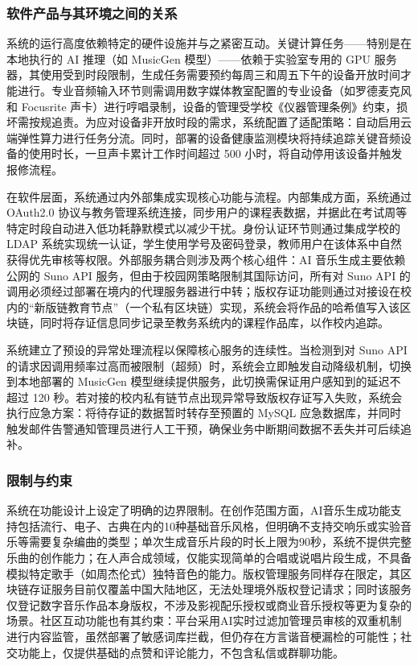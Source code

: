 \documentclass{base}
\numberwithin{figure}{section} %
\begin{document}
\subsubsection{软件产品与其环境之间的关系}

系统的运行高度依赖特定的硬件设施并与之紧密互动。关键计算任务——特别是在本地执行的 AI 推理（如 MusicGen 模型）——依赖于实验室专用的 GPU 服务器，其使用受到时段限制，生成任务需要预约每周三和周五下午的设备开放时间才能进行。专业音频输入环节则需调用数字媒体教室配置的专业设备（如罗德麦克风和 Focusrite 声卡）进行哼唱录制，设备的管理受学校《仪器管理条例》约束，损坏需按规追责。为应对设备非开放时段的需求，系统配置了适配策略：自动启用云端弹性算力进行任务分流。同时，部署的设备健康监测模块将持续追踪关键音频设备的使用时长，一旦声卡累计工作时间超过 500 小时，将自动停用该设备并触发报修流程。

​​在软件层面，系统通过内外部集成实现核心功能与流程。内部集成方面，系统通过 OAuth2.0 协议与教务管理系统连接，同步用户的课程表数据，并据此在考试周等特定时段自动进入低功耗静默模式以减少干扰。身份认证环节则通过集成学校的 LDAP 系统实现统一认证，学生使用学号及密码登录，教师用户在该体系中自然获得优先审核等权限。外部服务耦合则涉及两个核心组件：AI 音乐生成主要依赖公网的 Suno API 服务，但由于校园网策略限制其国际访问，所有对 Suno API 的调用必须经过部署在境内的代理服务器进行中转；版权存证功能则通过对接设在校内的“新版链教育节点”（一个私有区块链）实现，系统会将作品的哈希值写入该区块链，同时将存证信息同步记录至教务系统内的课程作品库，以作校内追踪。

​​系统建立了预设的异常处理流程以保障核心服务的连续性。当检测到对 Suno API 的请求因调用频率过高而被限制（超频）时，系统会立即触发自动降级机制，切换到本地部署的 MusicGen 模型继续提供服务，此切换需保证用户感知到的延迟不超过 120 秒。若对接的校内私有链节点出现异常导致版权存证写入失败，系统会执行应急方案：将待存证的数据暂时转存至预置的 MySQL 应急数据库，并同时触发邮件告警通知管理员进行人工干预，确保业务中断期间数据不丢失并可后续追补。

\subsubsection{限制与约束}

系统在功能设计上设定了明确的边界限制。在创作范围方面，AI音乐生成功能支持包括流行、电子、古典在内的10种基础音乐风格，但明确不支持交响乐或实验音乐等需要复杂编曲的类型；单次生成音乐片段的时长上限为90秒，系统不提供完整乐曲的创作能力；在人声合成领域，仅能实现简单的合唱或说唱片段生成，不具备模拟特定歌手（如周杰伦式）独特音色的能力。版权管理服务同样存在限定，其区块链存证服务目前仅覆盖中国大陆地区，无法处理境外版权登记请求；同时该服务仅登记数字音乐作品本身版权，不涉及影视配乐授权或商业音乐授权等更为复杂的场景。社区互动功能也有其约束：平台采用AI实时过滤加管理员审核的双重机制进行内容监管，虽然部署了敏感词库拦截，但仍存在方言谐音梗漏检的可能性；社交功能上，仅提供基础的点赞和评论能力，不包含私信或群聊功能。
\end{document}
